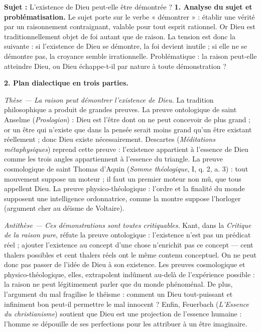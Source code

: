 \documentclass[11pt]{article}
\newcommand{\cle}[1]{{\popxbold\color{popdark}#1}}
\begin{document}
\begin{exoresolu}
\textbf{Sujet :} L'existence de Dieu peut-elle être démontrée ?
\tcblower
\textbf{1. Analyse du sujet et problématisation.} Le sujet porte sur le verbe « démontrer » : établir une vérité par un raisonnement contraignant, valable pour tout esprit rationnel. Or Dieu est traditionnellement objet de \cle{foi} autant que de \cle{raison}. La tension est donc la suivante : si l'existence de Dieu se démontre, la foi devient inutile ; si elle ne se démontre pas, la croyance semble irrationnelle. Problématique : la raison peut-elle atteindre Dieu, ou Dieu échappe-t-il par nature à toute démonstration ?

\textbf{2. Plan dialectique en trois parties.}

\emph{Thèse — La raison peut démontrer l'existence de Dieu.} La tradition philosophique a produit de grandes preuves. La preuve \cle{ontologique} de saint Anselme (\emph{Proslogion}) : Dieu est l'être dont on ne peut concevoir de plus grand ; or un être qui n'existe que dans la pensée serait moins grand qu'un être existant réellement ; donc Dieu existe nécessairement. Descartes (\emph{Méditations métaphysiques}) reprend cette preuve : l'existence appartient à l'essence de Dieu comme les trois angles appartiennent à l'essence du triangle. La preuve \cle{cosmologique} de saint Thomas d'Aquin (\emph{Somme théologique}, I, q. 2, a. 3) : tout mouvement suppose un moteur ; il faut un premier moteur non mû, que tous appellent Dieu. La preuve \cle{physico-théologique} : l'ordre et la finalité du monde supposent une intelligence ordonnatrice, comme la montre suppose l'horloger (argument cher au déisme de Voltaire).

\emph{Antithèse — Ces démonstrations sont toutes critiquables.} Kant, dans la \emph{Critique de la raison pure}, réfute la preuve ontologique : l'existence n'est pas un prédicat réel ; ajouter l'existence au concept d'une chose n'enrichit pas ce concept — cent thalers possibles et cent thalers réels ont le même contenu conceptuel. On ne peut donc pas passer de l'idée de Dieu à son existence. Les preuves cosmologique et physico-théologique, elles, extrapolent indûment au-delà de l'expérience possible : la raison ne peut légitimement parler que du monde phénoménal. De plus, l'argument du mal fragilise le théisme : comment un Dieu tout-puissant et infiniment bon peut-il permettre le mal innocent ? Enfin, Feuerbach (\emph{L'Essence du christianisme}) soutient que Dieu est une projection de l'essence humaine : l'homme se dépouille de ses perfections pour les attribuer à un être imaginaire.


\end{exoresolu}
\end{document}

